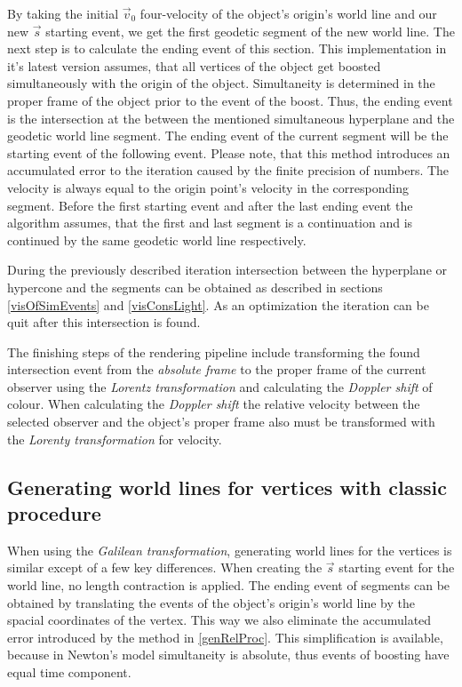 \documentclass{egpubl}
\begin{document}
By taking the initial $\vec{v}_0$ four-velocity of the object's origin's world line and our new $\vec{s}$ starting event, we get the first geodetic segment of the new world line. The next step is to calculate the ending event of this section. This implementation in it's latest version assumes, that all vertices of the object get boosted simultaneously with the origin of the object. Simultaneity is determined in the proper frame of the object prior to the event of the boost. Thus, the ending event is the intersection at the between the mentioned simultaneous hyperplane and the geodetic world line segment. The ending event of the current segment will be the starting event of the following event. Please note, that this method introduces an accumulated error to the iteration caused by the finite precision of numbers. The velocity is always equal to the origin point's velocity in the corresponding segment. Before the first starting event and after the last ending event the algorithm assumes, that the first  and last segment is a continuation and is continued by the same geodetic world line respectively.

During the previously described iteration intersection between the hyperplane or hypercone and the segments can be obtained as described in sections \ref{visOfSimEvents} and \ref{visConsLight}. As an optimization the iteration can be quit after this intersection is found.

The finishing steps of the rendering pipeline include transforming the found intersection event from the \emph{absolute frame} to the proper frame of the current observer using the \emph{Lorentz transformation} and calculating the \emph{Doppler shift} of colour. When calculating the \emph{Doppler shift} the relative velocity between the selected observer and the object's proper frame also must be transformed with the \emph{Lorenty transformation} for velocity.

\subsection{Generating world lines for vertices with classic procedure}
When using the \emph{Galilean transformation}, generating world lines for the vertices is similar except of a few key differences. When creating the $\vec{s}$ starting event for the world line, no length contraction is applied. The ending event of segments can be obtained by translating the events of the object's origin's world line by the spacial coordinates of the vertex. This way we also eliminate the accumulated error introduced by the method in \ref{genRelProc}. This simplification is available, because in Newton's model simultaneity is absolute, thus events of boosting have equal time component.
\end{document}
